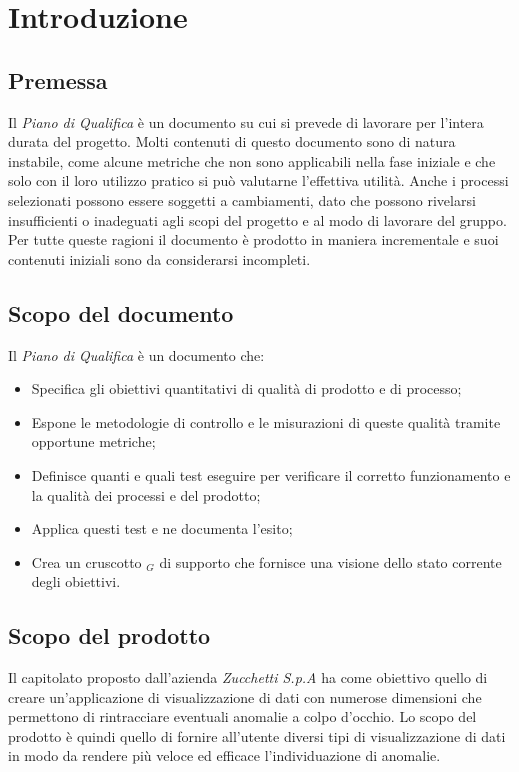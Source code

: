 \chapter{Introduzione}
\section{Premessa}

Il \textit{Piano di Qualifica} è un documento su cui si prevede di lavorare per l'intera durata del progetto. Molti contenuti di questo documento sono di natura instabile, come alcune metriche che non sono applicabili nella fase iniziale e che solo con il loro utilizzo pratico si può valutarne l'effettiva utilità. Anche i processi selezionati possono essere soggetti a cambiamenti, dato che possono rivelarsi insufficienti o inadeguati agli scopi del progetto e al modo di lavorare del gruppo.
Per tutte queste ragioni il documento è prodotto in maniera incrementale e suoi contenuti iniziali sono da considerarsi incompleti.

\section{Scopo del documento}
Il \textit{Piano di Qualifica} è un documento che:
\begin{itemize}
    \item Specifica gli obiettivi
    quantitativi di qualità di prodotto e di processo;
    \item Espone le
    metodologie di controllo e le misurazioni di queste qualità tramite
    opportune metriche;
    \item Definisce quanti e quali test eseguire per verificare il corretto funzionamento
    e la qualità dei processi e del prodotto;
    \item Applica questi test e ne documenta l'esito;
    \item Crea un cruscotto $_G$ di supporto che fornisce
    una visione dello stato corrente degli obiettivi.
\end{itemize}

\section{Scopo del prodotto}
Il capitolato proposto dall'azienda \textit{Zucchetti S.p.A} ha come obiettivo quello di creare un'applicazione di visualizzazione di dati con numerose dimensioni che permettono di rintracciare eventuali anomalie a colpo d'occhio. Lo scopo del prodotto è quindi quello di fornire all'utente diversi tipi di visualizzazione di dati in modo da rendere più veloce ed efficace l'individuazione di anomalie.

